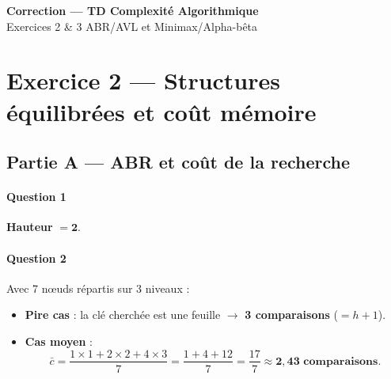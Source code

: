 \documentclass[a4paper,11pt]{article}
\newcommand{\boitereponse}[1]{%
  \begin{mdframed}[linecolor=black!40, backgroundcolor=white, linewidth=0.5pt,
                   innertopmargin=6pt, innerbottommargin=6pt]
  #1
  \end{mdframed}
}
\begin{document}
\begin{center}
  {\LARGE\bfseries Correction --- TD Complexité Algorithmique}\\[0.4em]
  {\large Exercices 2 \& 3 \textemdash{} ABR/AVL et Minimax/Alpha-bêta}\\[0.2em]
\end{center}

\section*{Exercice 2 --- Structures équilibrées et coût mémoire}

\subsection*{Partie A --- ABR et coût de la recherche}

\paragraph{Question 1}

\begin{center}
\end{center}

\boitereponse{%
\textbf{Hauteur} $= \mathbf{2}$.%
}

\paragraph{Question 2}

Avec 7 nœuds répartis sur 3 niveaux :

\begin{itemize}
  \item \textbf{Pire cas} : la clé cherchée est une feuille $\to$ \textbf{3 comparaisons} ($= h + 1$).
  \item \textbf{Cas moyen} :
  \[
    \bar{c} = \frac{1 \times 1 + 2 \times 2 + 4 \times 3}{7}
             = \frac{1 + 4 + 12}{7}
             = \frac{17}{7}
             \approx \mathbf{2{,}43} \textbf{ comparaisons.}
  \]
\end{itemize}
\end{document}
